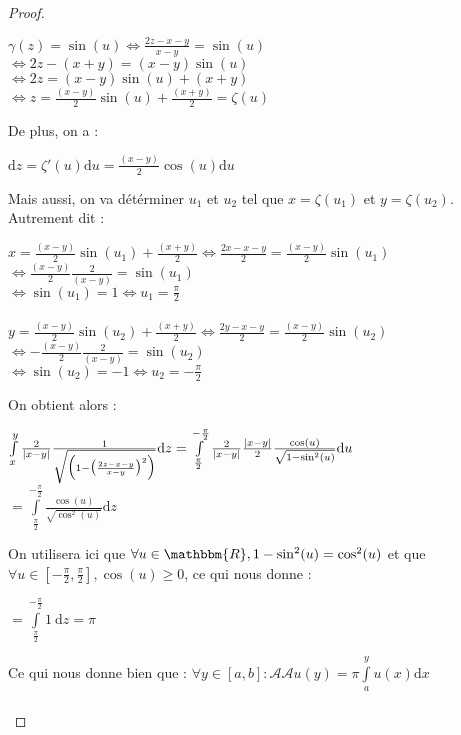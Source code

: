 \documentclass[french]{article}
\begin{document}
\begin{proof}
\begin{center}
    $\gamma(z)=\sin(u)\iff\frac{2z-x-y}{x-y}=\sin(u)$\\
    \hspace{4cm}$\iff2z-(x+y)=(x-y)\sin(u)$\\
    \hspace{4cm}$\iff2z=(x-y)\sin(u)+(x+y)$\\
    \hspace{4.5cm}$\iff z=\frac{(x-y)}{2}\sin(u)+\frac{(x+y)}{2}=\zeta(u)$
\end{center}
De plus, on a :
\begin{center}
    $\mathrm{d}z=\zeta'(u)\mathrm{d}u=\frac{(x-y)}{2}\cos(u)\mathrm{d}u$
\end{center}
Mais aussi, on va détérminer $u_{1}$ et $u_{2}$ tel que $x=\zeta(u_{1})$ et $y=\zeta(u_{2})$.\\
Autrement dit :
\begin{center}
    $x=\frac{(x-y)}{2}\sin(u_{1})+\frac{(x+y)}{2}\iff\frac{2x-x-y}{2}=\frac{(x-y)}{2}\sin(u_{1})$\\
    \hspace{3.7cm}$\iff\frac{(x-y)}{2}\frac{2}{(x-y)}=\sin(u_{1})$\\
    \hspace{4.3cm}$\iff\sin(u_{1})=1\iff u_{1}=\frac{\pi}{2}$\\
    \ \\
    $y=\frac{(x-y)}{2}\sin(u_{2})+\frac{(x+y)}{2}\iff\frac{2y-x-y}{2}=\frac{(x-y)}{2}\sin(u_{2})$\\
    \hspace{3.9cm}$\iff-\frac{(x-y)}{2}\frac{2}{(x-y)}=\sin(u_{2})$\\
    \hspace{4.8cm}$\iff\sin(u_{2})=-1\iff u_{2}=-\frac{\pi}{2}$
\end{center}
\newpage
On obtient alors :
\begin{center}
    $\int\limits_{x}^{y}\frac{2}{\mid x-y\mid}\frac{1}{\sqrt{\Bigl(1-\bigl(\frac{2z-x-y}{x-y}\bigr)^2\Bigr)}}\mathrm{d}z=\int\limits_{\frac{\pi}{2}}^{-\frac{\pi}{2}}\frac{2}{\mid x-y\mid}\frac{\mid x-y\mid}{2}\frac{\cos(u)}{\sqrt{1-\sin^2(u)}}\mathrm{d}u$\\
    $=\int\limits_{\frac{\pi}{2}}^{-\frac{\pi}{2}}\frac{\cos(u)}{\sqrt{\cos^2(u)}}\mathrm{d}z$
\end{center}
On utilisera ici que $\forall u\in\mathbbm{R}, 1-\sin^2(u)=\cos^2(u)$ et que $\forall u\in[-\frac{\pi}{2},\frac{\pi}{2}], \cos(u)\geq0$, ce qui nous donne :
\begin{center}
    $=\int\limits_{\frac{\pi}{2}}^{-\frac{\pi}{2}}1\ \mathrm{d}z=\pi$
\end{center}
Ce qui nous donne bien que : $\forall y\in[a,b] : \mathcal{A}\mathcal{A}u(y)=\pi\int\limits_{a}^{y}u(x)\mathrm{d}x$\\
\ \\
\end{proof}


\end{document}
